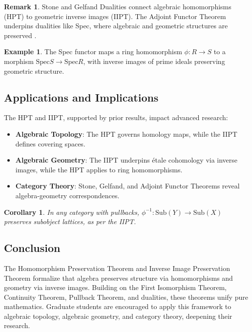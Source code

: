 \documentclass{article}
\theoremstyle{plain}
\newtheorem{corollary}{Corollary}
\theoremstyle{definition}
\newtheorem{example}{Example}
\newtheorem{remark}{Remark}
\newcommand{\Spec}{\mathrm{Spec}}
\begin{document}
\begin{remark}
Stone and Gelfand Dualities \cite{johnstone, takesaki} connect algebraic homomorphisms (HPT) to geometric inverse images (IIPT). The Adjoint Functor Theorem \cite{mac} underpins dualities like Spec, where algebraic and geometric structures are preserved \cite{hart}.
\end{remark}

\begin{example}
The Spec functor maps a ring homomorphism \(\phi: R \to S\) to a morphism \(\Spec S \to \Spec R\), with inverse images of prime ideals preserving geometric structure.
\end{example}

\subsection{Applications and Implications}
The HPT and IIPT, supported by prior results, impact advanced research:

\begin{itemize}
    \item \textbf{Algebraic Topology}: The HPT governs homology maps, while the IIPT defines covering spaces.
    \item \textbf{Algebraic Geometry}: The IIPT underpins étale cohomology via inverse images, while the HPT applies to ring homomorphisms.
    \item \textbf{Category Theory}: Stone, Gelfand, and Adjoint Functor Theorems reveal algebra-geometry correspondences.
\end{itemize}

\begin{corollary}
In any category with pullbacks, \(\phi^{-1}: \text{Sub}(Y) \to \text{Sub}(X)\) preserves subobject lattices, as per the IIPT.
\end{corollary}

\subsection{Conclusion}
The Homomorphism Preservation Theorem and Inverse Image Preservation Theorem formalize that algebra preserves structure via homomorphisms and geometry via inverse images. Building on the First Isomorphism Theorem, Continuity Theorem, Pullback Theorem, and dualities, these theorems unify pure mathematics. Graduate students are encouraged to apply this framework to algebraic topology, algebraic geometry, and category theory, deepening their research.
\end{document}
